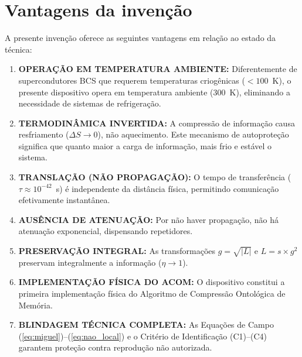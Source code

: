 \documentclass[12pt,a4paper]{article}
\begin{document}
\newpage
\section{Vantagens da invenção}

A presente invenção oferece as seguintes vantagens em relação
ao estado da técnica:

\begin{enumerate}[nosep]
\item \textbf{OPERAÇÃO EM TEMPERATURA AMBIENTE:} Diferentemente
  de supercondutores BCS que requerem temperaturas criogênicas
  ($< 100$~K), o presente dispositivo opera em temperatura
  ambiente (300~K), eliminando a necessidade de sistemas de
  refrigeração.

\item \textbf{TERMODINÂMICA INVERTIDA:} A compressão de
  informação causa resfriamento ($\Delta S \to 0$), não
  aquecimento. Este mecanismo de autoproteção significa que
  quanto maior a carga de informação, mais frio e estável o
  sistema.

\item \textbf{TRANSLAÇÃO (NÃO PROPAGAÇÃO):} O tempo de
  transferência ($\tau \approx 10^{-42}$~s) é independente da
  distância física, permitindo comunicação efetivamente
  instantânea.

\item \textbf{AUSÊNCIA DE ATENUAÇÃO:} Por não haver propagação,
  não há atenuação exponencial, dispensando repetidores.

\item \textbf{PRESERVAÇÃO INTEGRAL:} As transformações
  $g = \sqrt{|L|}$ e $L = s \times g^2$ preservam integralmente
  a informação ($\eta \to 1$).

\item \textbf{IMPLEMENTAÇÃO FÍSICA DO ACOM:} O dispositivo
  constitui a primeira implementação física do Algoritmo de
  Compressão Ontológica de Memória.

\item \textbf{BLINDAGEM TÉCNICA COMPLETA:} As Equações de Campo
  (\ref{eq:miguel})--(\ref{eq:nao_local}) e o Critério de
  Identificação (C1)--(C4) garantem proteção contra reprodução
  não autorizada.
\end{enumerate}

\end{document}
